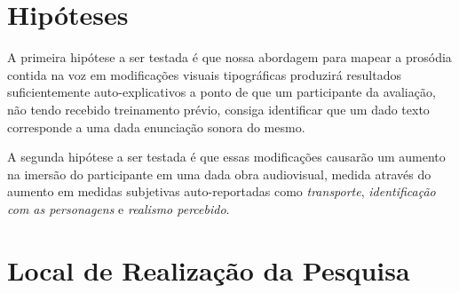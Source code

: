 \documentclass[a4paper,11pt,titlepage,singlespacing]{article}
\begin{document}
\section{Hipóteses}

\noindent A primeira hipótese a ser testada é que nossa abordagem para mapear a prosódia contida na voz em modificações visuais tipográficas produzirá resultados suficientemente auto-explicativos a ponto de que um participante da avaliação, não tendo recebido treinamento prévio, consiga identificar que um dado texto corresponde a uma dada enunciação sonora do mesmo.

A segunda hipótese a ser testada é que essas modificações causarão um aumento na imersão do participante em uma dada obra audiovisual, medida através do aumento em medidas subjetivas auto-reportadas como \textit{transporte}, \textit{identificação com as personagens} e \textit{realismo percebido}.



\section{Local de Realização da Pesquisa}
\end{document}
